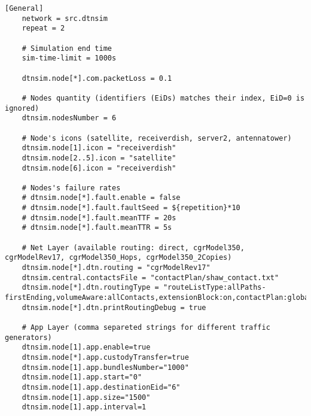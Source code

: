 \begin{lstlisting}[caption=inifile,label=inifile,]
    [General]
    network = src.dtnsim										
    repeat = 2
    
    # Simulation end time
    sim-time-limit = 1000s
    
    dtnsim.node[*].com.packetLoss = 0.1
    
    # Nodes quantity (identifiers (EiDs) matches their index, EiD=0 is ignored)			
    dtnsim.nodesNumber = 6	
    
    # Node's icons (satellite, receiverdish, server2, antennatower)
    dtnsim.node[1].icon = "receiverdish"
    dtnsim.node[2..5].icon = "satellite"
    dtnsim.node[6].icon = "receiverdish"
    
    # Nodes's failure rates
    # dtnsim.node[*].fault.enable = false
    # dtnsim.node[*].fault.faultSeed = ${repetition}*10
    # dtnsim.node[*].fault.meanTTF = 20s
    # dtnsim.node[*].fault.meanTTR = 5s
    
    # Net Layer (available routing: direct, cgrModel350, cgrModelRev17, cgrModel350_Hops, cgrModel350_2Copies)
    dtnsim.node[*].dtn.routing = "cgrModelRev17"
    dtnsim.central.contactsFile = "contactPlan/shaw_contact.txt"
    dtnsim.node[*].dtn.routingType = "routeListType:allPaths-firstEnding,volumeAware:allContacts,extensionBlock:on,contactPlan:global"
    dtnsim.node[*].dtn.printRoutingDebug = true
    
    # App Layer (comma separeted strings for different traffic generators)			
    dtnsim.node[1].app.enable=true
    dtnsim.node[*].app.custodyTransfer=true
    dtnsim.node[1].app.bundlesNumber="1000"
    dtnsim.node[1].app.start="0"			 
    dtnsim.node[1].app.destinationEid="6"
    dtnsim.node[1].app.size="1500"
    dtnsim.node[1].app.interval=1
\end{lstlisting}